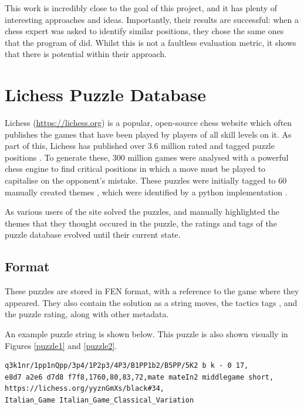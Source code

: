 This work is incredibly close to the goal of this project, and it has plenty of
interesting approaches and ideas. Importantly, their results are successful:
when a chess expert was asked to identify similar positions, they chose the
same ones that the program of \cite{chessMotifs} did. Whilst this is not a
faultless evaluation metric, it shows that there is potential within their
approach.

\section{Lichess Puzzle Database}\label{lichessPuzzlesSection}

Lichess (\url{https://lichess.org}) is a popular, open-source chess website
which often publishes the games that have been played by players of all skill
levels on it. As part of this, Lichess has published over 3.6 million rated and
tagged puzzle positions \citep{lichessPuzzles}. To generate these, 300 million
games were analysed with a powerful chess engine to find critical positions in
which a move must be played to capitalise on the opponent's mistake. These
puzzles were initially tagged to 60 manually created themes
\citep{lichessXML}, which were identified by a python implementation
\citep{lichessTagger}.

As various users of the site solved the puzzles, and manually highlighted the
themes that they thought occured in the puzzle, the ratings and tags of the
puzzle database evolved until their current state.

\subsection{Format}

These puzzles are stored in FEN format, with a reference to the game where they
appeared. They also contain the solution as a string moves, the tactics tags
\citep{lichessXML}, and the puzzle rating, along with other metadata.

An example puzzle string is shown below. This puzzle is also shown visually in
Figures \ref{puzzle1} and \ref{puzzle2}.

\begin{verbatim}
q3k1nr/1pp1nQpp/3p4/1P2p3/4P3/B1PP1b2/B5PP/5K2 b k - 0 17,
e8d7 a2e6 d7d8 f7f8,1760,80,83,72,mate mateIn2 middlegame short,
https://lichess.org/yyznGmXs/black#34,
Italian_Game Italian_Game_Classical_Variation
\end{verbatim}

